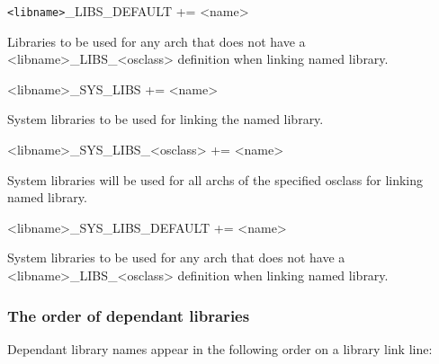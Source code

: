 \begin{description}\item \verb|<libname>|\_LIBS\_DEFAULT += \textless{}name\textgreater{}

\end{description}Libraries to be used for any arch that does not have a \textless{}libname\textgreater{}\_LIBS\_\textless{}osclass\textgreater{} definition when linking 
named library.



\begin{description}\item \textless{}libname\textgreater{}\_SYS\_LIBS += \textless{}name\textgreater{}

\end{description}System libraries to be used for linking the named library.

\begin{description}\item \textless{}libname\textgreater{}\_SYS\_LIBS\_\textless{}osclass\textgreater{} += \textless{}name\textgreater{}

\end{description}System libraries will be used for all archs of the specified osclass for linking named library.

\begin{description}\item \textless{}libname\textgreater{}\_SYS\_LIBS\_DEFAULT += \textless{}name\textgreater{}

\end{description}System libraries to be used for any arch that does not have a \textless{}libname\textgreater{}\_LIBS\_\textless{}osclass\textgreater{} definition when 
linking named library.

\subsubsection{The order of dependant libraries}

Dependant library names appear in the following order on a library link line:

